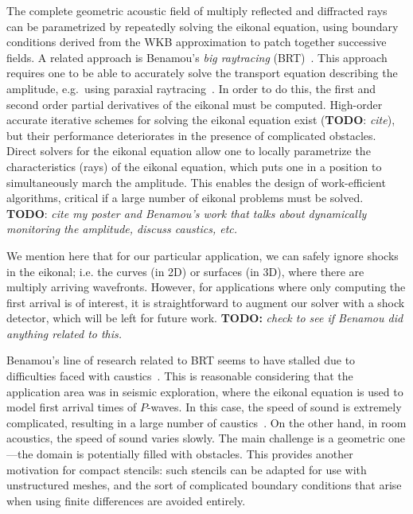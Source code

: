 \documentclass{siamart190516}
\begin{document}
The complete geometric acoustic field of multiply reflected and
diffracted rays can be parametrized by repeatedly solving the eikonal
equation, using boundary conditions derived from the WKB approximation
to patch together successive fields. A related approach is Benamou's
\emph{big raytracing} (BRT)~\cite{Benamou:1996aa,Benamou:1997aa}. This
approach requires one to be able to accurately solve the transport
equation describing the amplitude, e.g.\ using paraxial
raytracing~\cite{Popov:2002aa}. In order to do this, the first and
second order partial derivatives of the eikonal must be
computed. High-order accurate iterative schemes for solving the
eikonal equation exist (\textbf{TODO}: \emph{cite}), but their
performance deteriorates in the presence of complicated
obstacles. Direct solvers for the eikonal equation allow one to
locally parametrize the characteristics (rays) of the eikonal
equation, which puts one in a position to simultaneously march the
amplitude. This enables the design of work-efficient algorithms,
critical if a large number of eikonal problems must be
solved. \textbf{TODO}: \emph{cite my poster and Benamou's work that
  talks about dynamically monitoring the amplitude, discuss caustics,
  etc.}

We mention here that for our particular application, we can safely
ignore shocks in the eikonal; i.e. the curves (in 2D) or surfaces (in
3D), where there are multiply arriving wavefronts. However, for
applications where only computing the first arrival is of interest, it
is straightforward to augment our solver with a shock detector, which
will be left for future work. \textbf{TODO:} \emph{check to see if
  Benamou did anything related to this.}

Benamou's line of research related to BRT seems to have stalled due to
difficulties faced with caustics~\cite{Benamou:2003aa}. This is
reasonable considering that the application area was in seismic
exploration, where the eikonal equation is used to model first arrival
times of $P$-waves. In this case, the speed of sound is extremely
complicated, resulting in a large number of
caustics~\cite{Versteeg:1994aa}. On the other hand, in room acoustics,
the speed of sound varies slowly. The main challenge is a geometric
one---the domain is potentially filled with obstacles. This provides
another motivation for compact stencils: such stencils can be adapted
for use with unstructured meshes, and the sort of complicated boundary
conditions that arise when using finite differences are avoided
entirely.
\end{document}
